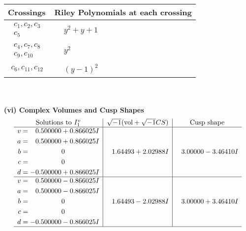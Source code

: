 \documentclass[1p]{elsarticle_modified}
\theoremstyle{definition}
\newcommand{\I}{\sqrt{-1}}
\begin{document}
\begin{tabular}{m{50pt}|m{274pt}}
Crossings & \hspace{64pt}Riley Polynomials at each crossing \\
\hline $$\begin{aligned}c_{1},c_{2},c_{3}\\c_{5}\end{aligned}$$&$\begin{aligned}
&y^2+y+1
\end{aligned}$\\
\hline $$\begin{aligned}c_{4},c_{7},c_{8}\\c_{9},c_{10}\end{aligned}$$&$\begin{aligned}
&y^2
\end{aligned}$\\
\hline $$\begin{aligned}c_{6},c_{11},c_{12}\end{aligned}$$&$\begin{aligned}
&(y-1)^2
\end{aligned}$\\
\hline
\end{tabular}\\~\\
\newpage\flushleft \textbf{(vi) Complex Volumes and Cusp Shapes}
$$\begin{array}{c|c|c}  
\text{Solutions to }I^v_{1}& \I (\text{vol} + \sqrt{-1}CS) & \text{Cusp shape}\\
 \hline 
\begin{aligned}
v &= \phantom{-}0.500000 + 0.866025 I \\
a &= \phantom{-}0.500000 + 0.866025 I \\
b &= \phantom{-0.000000 } 0 \\
c &= \phantom{-0.000000 } 0 \\
d &= -0.500000 + 0.866025 I\end{aligned}
 & \phantom{-}1.64493 + 2.02988 I & \phantom{-}3.00000 - 3.46410 I \\ \hline\begin{aligned}
v &= \phantom{-}0.500000 - 0.866025 I \\
a &= \phantom{-}0.500000 - 0.866025 I \\
b &= \phantom{-0.000000 } 0 \\
c &= \phantom{-0.000000 } 0 \\
d &= -0.500000 - 0.866025 I\end{aligned}
 & \phantom{-}1.64493 - 2.02988 I & \phantom{-}3.00000 + 3.46410 I\\
 \hline 
 \end{array}$$\newpage\newpage\renewcommand{\arraystretch}{1}
\end{document}
